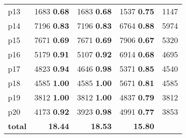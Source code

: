 \begin{tabular}{lrrrr}
\multicolumn{1}{l|}{p13} & {\footnotesize 1683} \textbf{0.68} & {\footnotesize 1683} \textbf{0.68} & {\footnotesize 1537} \textbf{0.75} & \multicolumn{1}{|r}{1147}\\
\multicolumn{1}{l|}{p14} & {\footnotesize 7196} \textbf{0.83} & {\footnotesize 7196} \textbf{0.83} & {\footnotesize 6764} \textbf{0.88} & \multicolumn{1}{|r}{5974}\\
\multicolumn{1}{l|}{p15} & {\footnotesize 7671} \textbf{0.69} & {\footnotesize 7671} \textbf{0.69} & {\footnotesize 7906} \textbf{0.67} & \multicolumn{1}{|r}{5320}\\
\multicolumn{1}{l|}{p16} & {\footnotesize 5179} \textbf{0.91} & {\footnotesize 5107} \textbf{0.92} & {\footnotesize 6914} \textbf{0.68} & \multicolumn{1}{|r}{4695}\\
\multicolumn{1}{l|}{p17} & {\footnotesize 4823} \textbf{0.94} & {\footnotesize 4646} \textbf{0.98} & {\footnotesize 5371} \textbf{0.85} & \multicolumn{1}{|r}{4540}\\
\multicolumn{1}{l|}{p18} & {\footnotesize 4585} \textbf{1.00} & {\footnotesize 4585} \textbf{1.00} & {\footnotesize 5671} \textbf{0.81} & \multicolumn{1}{|r}{4585}\\
\multicolumn{1}{l|}{p19} & {\footnotesize 3812} \textbf{1.00} & {\footnotesize 3812} \textbf{1.00} & {\footnotesize 4837} \textbf{0.79} & \multicolumn{1}{|r}{3812}\\
\multicolumn{1}{l|}{p20} & {\footnotesize 4173} \textbf{0.92} & {\footnotesize 3923} \textbf{0.98} & {\footnotesize 4991} \textbf{0.77} & \multicolumn{1}{|r}{3853}\\
\midrule
\textbf{total} & \textbf{18.44} & \textbf{18.53} & \textbf{15.80} & \\
\bottomrule
\end{tabular}

